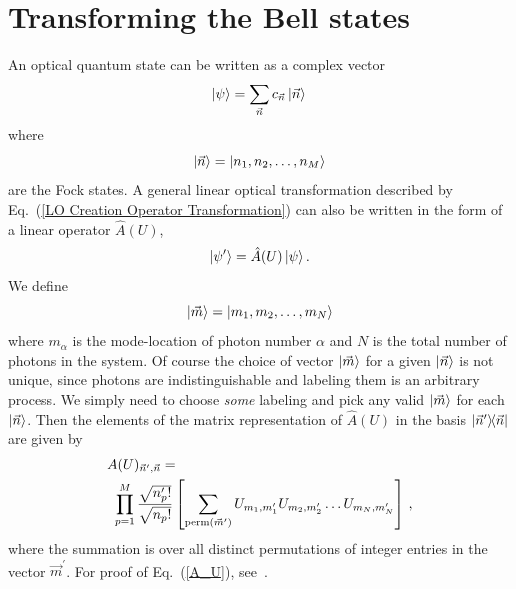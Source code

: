 \documentclass[aps,pra,twocolumn,showpacs,superscriptaddress,floatfix,10pt]{revtex4}
\begin{document}
\section{Transforming the Bell states}
An optical quantum state can be written as a complex vector
\begin{equation}
\label{LO State Fock Vec Basis}
\ket{\psi} = \sum_{\vec{n}} c_{\vec{n}} \ket{\vec{n}} \,
\end{equation}
where
\begin{equation}
\ket{\vec{n}} = \ket{n_1,n_2,\dots,n_M}
\end{equation}
are the Fock states. A general linear optical transformation described by Eq.~(\ref{LO Creation Operator Transformation}) can also be written in the form of a linear operator $\hat{A}(U)$,
\begin{equation}
	\ket{\psi^\prime} = \hat{A}(U) \ket{\psi}.
\end{equation}
We define
\begin{equation}
\label{m definition}
\ket{\vec{m}} = \ket{m_1,m_2,\dots,m_N}
\end{equation}
where $m_\alpha$ is the mode-location of photon number $\alpha$ and $N$ is the total number of photons in the system. Of course the choice of vector $\ket{\vec{m}}$ for a given $\ket{\vec{n}}$ is not unique, since photons are indistinguishable and labeling them is an arbitrary process. We simply need to choose \textit{some} labeling and pick any valid $\ket{\vec{m}}$ for each $\ket{\vec{n}}$. Then the elements of the matrix representation of $\hat{A}(U)$ in the basis $\outerproduct{\vec{n}^\prime}{\vec{n}}$ are given by
\begin{eqnarray}
\label{A_U}
A(U)_{\vec{n}^\prime,\vec{n}} = \quad \quad \quad \quad \quad \quad \quad \quad \quad \quad \quad \quad \quad \quad \quad \quad \quad \\ \small \nonumber \prod_{p=1}^{M} \frac{\sqrt{n_p^\prime !}}{\sqrt{n_p !}} \left[\sum_{\textrm{perm}(\vec{m}^\prime)} U_{m_1, m_1^\prime} U_{m_2, m_2^\prime} \dots U_{m_N, m_N^\prime} \right] \,,
\end{eqnarray}
where the summation is over all distinct permutations of integer entries in the vector $\vec{m}^\prime$. For proof of Eq.~(\ref{A_U}), see~\cite{Jake Smith}.
\end{document}
